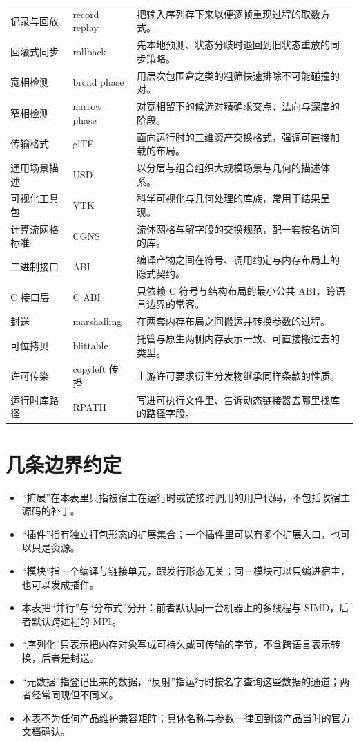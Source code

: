 \documentclass[12pt,a4paper,fontset=fandol]{ctexbook}
\newcommand{\Lang}[1]{\textsf{#1}}
\newcommand{\CL}{\Lang{C}}
\begin{document}
\begin{longtable}{>{\raggedright\arraybackslash}p{}>{\raggedright\arraybackslash}p{}>{\raggedright\arraybackslash}p{}}
记录与回放 & record replay & 把输入序列存下来以便逐帧重现过程的取数方式。 \\
回滚式同步 & rollback & 先本地预测、状态分歧时退回到旧状态重放的同步策略。 \\
宽相检测 & broad phase & 用层次包围盒之类的粗筛快速排除不可能碰撞的对。 \\
窄相检测 & narrow phase & 对宽相留下的候选对精确求交点、法向与深度的阶段。 \\
传输格式 & glTF & 面向运行时的三维资产交换格式，强调可直接加载的布局。 \\
通用场景描述 & USD & 以分层与组合组织大规模场景与几何的描述体系。 \\
可视化工具包 & VTK & 科学可视化与几何处理的库族，常用于结果呈现。 \\
计算流网格标准 & CGNS & 流体网格与解字段的交换规范，配一套按名访问的库。 \\
二进制接口 & ABI & 编译产物之间在符号、调用约定与内存布局上的隐式契约。 \\
C 接口层 & C ABI & 只依赖 \CL{} 符号与结构布局的最小公共 ABI，跨语言边界的常客。 \\
封送 & marshalling & 在两套内存布局之间搬运并转换参数的过程。 \\
可位拷贝 & blittable & 托管与原生两侧内存表示一致、可直接搬过去的类型。 \\
许可传染 & copyleft 传播 & 上游许可要求衍生分发物继承同样条款的性质。 \\
运行时库路径 & RPATH & 写进可执行文件里、告诉动态链接器去哪里找库的路径字段。 \\
\end{longtable}
\normalsize

\section{几条边界约定}

\begin{itemize}
\item ``扩展''在本表里只指被宿主在运行时或链接时调用的用户代码，不包括改宿主源码的补丁。
\item ``插件''指有独立打包形态的扩展集合；一个插件里可以有多个扩展入口，也可以只是资源。
\item ``模块''指一个编译与链接单元，跟发行形态无关；同一模块可以只编进宿主，也可以发成插件。
\item 本表把``并行''与``分布式''分开：前者默认同一台机器上的多线程与 SIMD，后者默认跨进程的 MPI。
\item ``序列化''只表示把内存对象写成可持久或可传输的字节，不含跨语言表示转换，后者是封送。
\item ``元数据''指登记出来的数据，``反射''指运行时按名字查询这些数据的通道；两者经常同现但不同义。
\item 本表不为任何产品维护兼容矩阵；具体名称与参数一律回到该产品当时的官方文档确认。
\end{itemize}
\end{document}

